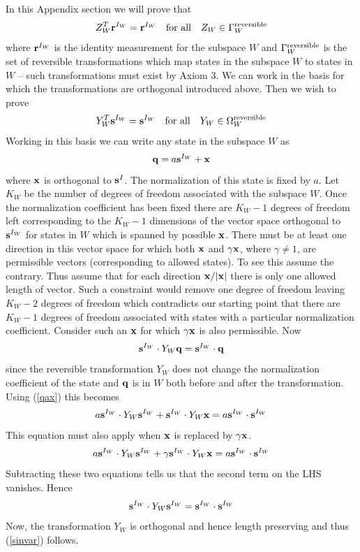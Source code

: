 \documentclass[10pt,twocolumn]{article}
\begin{document}
In this Appendix section we will prove that
\begin{equation}
Z_W^T{\bf r}^{I_W}={\bf r}^{I_W} ~~~{\rm for~all} ~~~Z_W\in\Gamma_W^{\rm
reversible}
\end{equation}
where ${\bf r}^{I_W}$ is the identity measurement for the subspace $W$
and $\Gamma_W^{\rm reversible}$ is the set of reversible
transformations which map states in the subspace $W$ to states in $W$ --
such transformations must exist by Axiom 3.
We can work in the basis for which the transformations are orthogonal
introduced above.  Then we wish to prove
\begin{equation}\label{sinvar}
Y^T_W{\bf s}^{I_W}={\bf s}^{I_W} ~~~{\rm for~all}~~~Y_W\in\Omega_W^{\rm
reversible}
\end{equation}
Working in this basis we can write any state in the subspace $W$ as
\begin{equation}\label{qax}
{\bf q}= a {\bf s}^{I_W} + {\bf x}
\end{equation}
where ${\bf x}$ is orthogonal to ${\bf s}^I$.
The normalization of this state is fixed by $a$. Let $K_W$ be the number
of degrees of freedom associated with the subspace $W$.
 Once the normalization
coefficient has been fixed there are $K_W-1$ degrees of freedom left
corresponding to the $K_W-1$ dimensions of the vector space orthogonal to
${\bf s}^{I_W}$  for states in $W$ which is spanned by possible ${\bf
x}$.  There must be
at least one direction in this vector space for which both ${\bf x}$
and $\gamma{\bf x}$, where $\gamma\not=1$,
are permissible vectors (corresponding to allowed states).  To see this
assume the contrary. Thus assume that for each direction ${\bf x}/|{\bf
x}|$ there is only one allowed length of vector. Such a constraint would
remove one degree of freedom leaving $K_W-2$ degrees of freedom which
contradicts our starting point that there are
$K_W-1$ degrees of freedom
associated with states with a particular normalization coefficient.
Consider such an ${\bf x}$ for which $\gamma{\bf x}$ is also
permissible. Now
\begin{equation}
{\bf s}^{I_W}\cdot Y_W {\bf q}={\bf s}^{I_W}\cdot{\bf q}
\end{equation}
since the reversible transformation $Y_W$ does not change the
normalization coefficient of the state and ${\bf q}$ is in $W$ both
before and after the transformation. Using (\ref{qax}) this becomes
\begin{equation}
a{\bf s}^{I_W}\cdot Y_W {\bf s}^{I_W} + {\bf s}^{I_W}\cdot Y_W {\bf x}
 =a{\bf s}^{I_W}\cdot{\bf s}^{I_W}
\end{equation}
This equation must also apply when ${\bf x}$ is replaced by $\gamma{\bf
x}$.
\begin{equation}
a{\bf s}^{I_W}\cdot Y_W {\bf s}^{I_W} + \gamma{\bf s}^{I_W}\cdot Y_W {\bf x}
 =a{\bf s}^{I_W}\cdot{\bf s}^{I_W}
\end{equation}
Subtracting these two equations tells us that the second term on the LHS
vanishes. Hence
\begin{equation}
{\bf s}^{I_W}\cdot Y_W {\bf s}^{I_W}
 ={\bf s}^{I_W}\cdot{\bf s}^{I_W}
\end{equation}
Now, the transformation $Y_W$ is orthogonal and hence length preserving
and thus (\ref{sinvar}) follows.
\end{document}
